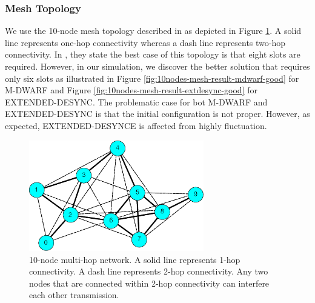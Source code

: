 \subsubsection{Mesh Topology}
We use the 10-node mesh topology described in \cite{4663417} as depicted in Figure \ref{fig:10nodes-topo}. A solid line represents one-hop connectivity whereas a dash line represents two-hop connectivity. In \cite{4663417}, they state the best case of this topology is that eight slots are required. However, in our simulation, we discover the better solution that requires only six slots as illustrated in Figure \ref{fig:10nodes-mesh-result-mdwarf-good} for M-DWARF and Figure \ref{fig:10nodes-mesh-result-extdesync-good} for EXTENDED-DESYNC. The problematic case for bot M-DWARF and EXTENDED-DESYNC is that the initial configuration is not proper. However, as expected, EXTENDED-DESYNCE is affected from highly fluctuation.
\begin{figure}[!t]
\centering
\includegraphics[width=3in]{figure/10nodes-topo-mhop}
\caption{10-node multi-hop network. A solid line represents 1-hop connectivity. A dash line represents 2-hop connectivity. Any two nodes that are connected within 2-hop connectivity can interfere each other transmission.}
\label{fig:10nodes-topo}
\end{figure}

